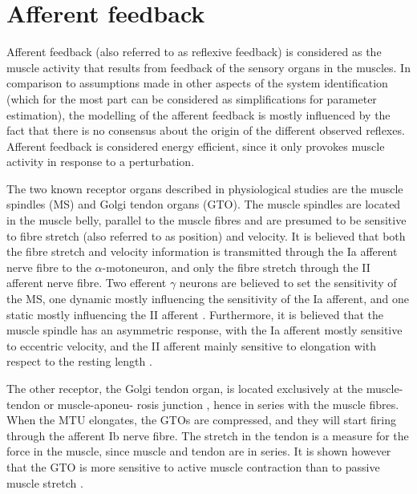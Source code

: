 \section{Afferent feedback} \label{sec:ass_afferent}
Afferent feedback (also referred to as reflexive feedback) is considered as the muscle activity that results from feedback of the sensory organs in the muscles. In comparison to assumptions made in other aspects of the system identification (which for the most part can be considered as simplifications for parameter estimation), the modelling of the afferent feedback is mostly influenced by the fact that there is no consensus about the origin of the different observed reflexes. Afferent feedback is considered energy efficient, since it only provokes muscle activity in response to a perturbation. 

The two known receptor organs described in physiological studies are the muscle spindles (MS) and Golgi tendon organs (GTO). The muscle spindles are located in the muscle belly, parallel to the muscle fibres and are presumed to be sensitive to fibre stretch (also referred to as position) and velocity. It is believed that both the fibre stretch and velocity information is transmitted through the Ia afferent nerve fibre to the $\alpha$-motoneuron, and only the fibre stretch through the II afferent nerve fibre. Two efferent $\gamma$ neurons are believed to set the sensitivity of the MS, one dynamic mostly influencing the sensitivity of the Ia afferent, and one static mostly influencing the II afferent \cite{mileusnic_mathematical_2006}. Furthermore, it is believed that the muscle spindle has an asymmetric response, with the Ia afferent mostly sensitive to eccentric velocity, and the II afferent mainly sensitive to elongation with respect to the resting length \cite{burke_muscle_1978}. 

The other receptor, the Golgi tendon organ, is located exclusively at the muscle-tendon or muscle-aponeu- rosis junction \cite{jami_golgi_1992}, hence in series with the muscle fibres. When the MTU elongates, the GTOs are compressed, and they will start firing through the afferent Ib nerve fibre. The stretch in the tendon is a measure for the force in the muscle, since muscle and tendon are in series. It is shown however that the GTO is more sensitive to active muscle contraction than to passive muscle stretch \cite{houk_responses_1967}.



